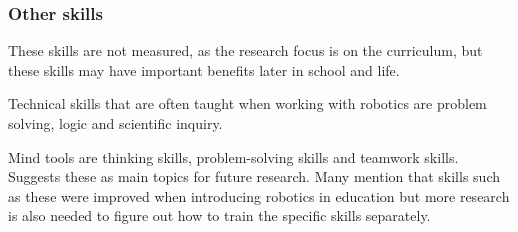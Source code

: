 \subsubsection*{Other skills}
These skills are not measured, as the research focus is on the curriculum, but these skills may have important benefits later in school and life.

\bigskip\noindent
Technical skills that are often taught when working with robotics are problem solving, logic and scientific inquiry. 

\bigskip\noindent
Mind tools are thinking skills, problem-solving skills and teamwork skills. \cite{Benitti2012978} Suggests these as main topics for future research. Many mention that skills such as these were improved when introducing robotics in education but more research is also needed to figure out how to train the specific skills separately. 
